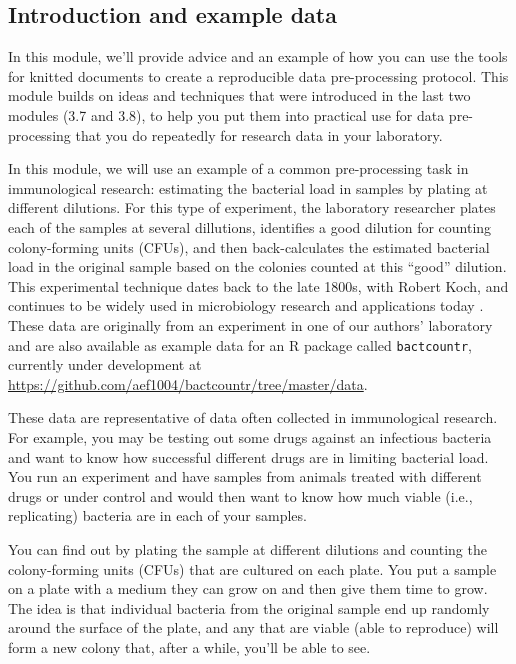 \documentclass[]{tufte-book}
\begin{document}
\subsection{Introduction and example data}\label{introduction-and-example-data}

In this module, we'll provide advice and an example of how you can use the
tools for knitted documents to create a reproducible data pre-processing
protocol. This module builds on ideas and techniques that were introduced
in the last two modules (3.7 and 3.8), to help you put them into practical use for
data pre-processing that you do repeatedly for research data in your
laboratory.

In this module, we will use an example of a common pre-processing task in
immunological research: estimating the bacterial load in samples by plating at
different dilutions. For this type of experiment, the laboratory researcher
plates each of the samples at several dillutions, identifies a good dilution for
counting colony-forming units (CFUs), and then back-calculates the estimated
bacterial load in the original sample based on the colonies counted at this ``good''
dilution. This experimental technique dates back to the late 1800s, with Robert
Koch, and continues to be widely used in microbiology research and applications
today \citep{ben2014estimation}. These data are originally from an experiment in one
of our authors' laboratory and are also available as example data for an R
package called \texttt{bactcountr}, currently under development at
\url{https://github.com/aef1004/bactcountr/tree/master/data}.

These data are representative of data often collected in immunological research.
For example, you may be testing out some drugs against an infectious bacteria
and want to know how successful different drugs are in limiting bacterial load.
You run an experiment and have samples from animals treated with different drugs
or under control and would then want to know how much viable (i.e., replicating)
bacteria are in each of your samples.

You can find out by plating the sample at different dilutions and
counting the colony-forming units (CFUs) that are cultured on each plate.
You put a sample on a plate with a medium they can grow on and then give them
time to grow. The idea is that individual bacteria from the original sample end
up randomly around the surface of the plate, and any that are viable (able to
reproduce) will form a new colony that, after a while, you'll be able to see.
\end{document}
